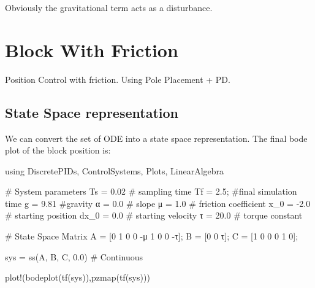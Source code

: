 \documentclass[
  8pt,
  a4paper,
]{book}
\newenvironment{Shaded}{\begin{snugshade}}{\end{snugshade}}
\newcommand{\BuiltInTok}[1]{\textcolor[rgb]{0.00,0.23,0.31}{#1}}
\newcommand{\CommentTok}[1]{\textcolor[rgb]{0.37,0.37,0.37}{#1}}
\newcommand{\FloatTok}[1]{\textcolor[rgb]{0.68,0.00,0.00}{#1}}
\newcommand{\FunctionTok}[1]{\textcolor[rgb]{0.28,0.35,0.67}{#1}}
\newcommand{\ImportTok}[1]{\textcolor[rgb]{0.00,0.46,0.62}{#1}}
\newcommand{\NormalTok}[1]{\textcolor[rgb]{0.00,0.23,0.31}{#1}}
\newcommand{\OperatorTok}[1]{\textcolor[rgb]{0.37,0.37,0.37}{#1}}
\begin{document}
Obviously the gravitational term acts as a disturbance.

\chapter{Block With Friction}\label{block-with-friction}

Position Control with friction. Using Pole Placement + PD.

\hfill\break

\section{State Space representation}\label{state-space-representation}

We can convert the set of ODE into a state space representation. The
final bode plot of the block position is:

\begin{Shaded}
\begin{Highlighting}[]
\ImportTok{using} \BuiltInTok{DiscretePIDs}\NormalTok{, }\BuiltInTok{ControlSystems}\NormalTok{, }\BuiltInTok{Plots}\NormalTok{, }\BuiltInTok{LinearAlgebra}

\CommentTok{\# System parameters}
\NormalTok{Ts }\OperatorTok{=} \FloatTok{0.02} \CommentTok{\# sampling time}
\NormalTok{Tf }\OperatorTok{=} \FloatTok{2.5}\NormalTok{; }\CommentTok{\#final simulation time}
\NormalTok{g }\OperatorTok{=} \FloatTok{9.81} \CommentTok{\#gravity}
\NormalTok{α }\OperatorTok{=} \FloatTok{0.0} \CommentTok{\# slope}
\NormalTok{μ }\OperatorTok{=} \FloatTok{1.0} \CommentTok{\# friction coefficient}
\NormalTok{x\_0 }\OperatorTok{=} \OperatorTok{{-}}\FloatTok{2.0} \CommentTok{\# starting position}
\NormalTok{dx\_0 }\OperatorTok{=} \FloatTok{0.0} \CommentTok{\# starting velocity}
\NormalTok{τ }\OperatorTok{=} \FloatTok{20.0} \CommentTok{\# torque constant }

\CommentTok{\# State Space Matrix}
\NormalTok{A }\OperatorTok{=}\NormalTok{ [}\FloatTok{0} \FloatTok{1} \FloatTok{0}
    \FloatTok{0} \OperatorTok{{-}}\NormalTok{μ }\FloatTok{1}
    \FloatTok{0} \FloatTok{0} \OperatorTok{{-}}\NormalTok{τ];}
\NormalTok{B }\OperatorTok{=}\NormalTok{ [}\FloatTok{0}
    \FloatTok{0}
\NormalTok{    τ];}
\NormalTok{C }\OperatorTok{=}\NormalTok{ [}\FloatTok{1} \FloatTok{0} \FloatTok{0}
    \FloatTok{0} \FloatTok{1} \FloatTok{0}\NormalTok{];}

\NormalTok{sys }\OperatorTok{=} \FunctionTok{ss}\NormalTok{(A, B, C, }\FloatTok{0.0}\NormalTok{)      }\CommentTok{\# Continuous}

\FunctionTok{plot!}\NormalTok{(}\FunctionTok{bodeplot}\NormalTok{(}\FunctionTok{tf}\NormalTok{(sys)),}\FunctionTok{pzmap}\NormalTok{(}\FunctionTok{tf}\NormalTok{(sys)))}
\end{Highlighting}
\end{Shaded}
\end{document}
